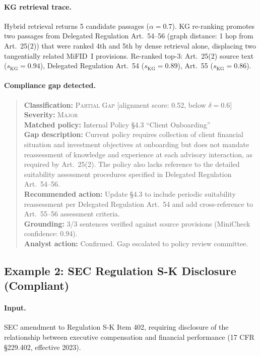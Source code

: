 \documentclass[11pt]{article}
\begin{document}
\paragraph{KG retrieval trace.}  Hybrid retrieval returns 5 candidate passages ($\alpha{=}0.7$). KG re-ranking promotes two passages from Delegated Regulation Art.~54--56 (graph distance: 1 hop from Art.~25(2)) that were ranked 4th and 5th by dense retrieval alone, displacing two tangentially related MiFID~I provisions. Re-ranked top-3: Art.~25(2) source text ($s_{\text{KG}}{=}0.94$), Delegated Regulation Art.~54 ($s_{\text{KG}}{=}0.89$), Art.~55 ($s_{\text{KG}}{=}0.86$).

\paragraph{Compliance gap detected.}
\begin{quote}
	\small
	\textbf{Classification:} \textsc{Partial Gap} \hfill [alignment score: 0.52, below $\delta{=}0.6$] \\
	\textbf{Severity:} \textsc{Major} \\
	\textbf{Matched policy:} Internal Policy \S4.3 ``Client Onboarding'' \\
	\textbf{Gap description:} Current policy requires collection of client financial situation and investment objectives at onboarding but does not mandate reassessment of knowledge and experience at each advisory interaction, as required by Art.~25(2). The policy also lacks reference to the detailed suitability assessment procedures specified in Delegated Regulation Art.~54--56. \\
	\textbf{Recommended action:} Update \S4.3 to include periodic suitability reassessment per Delegated Regulation Art.~54 and add cross-reference to Art.~55--56 assessment criteria. \\
	\textbf{Grounding:} 3/3 sentences verified against source provisions (MiniCheck confidence: 0.94). \\
	\textbf{Analyst action:} Confirmed. Gap escalated to policy review committee.
\end{quote}

\subsection{Example 2: SEC Regulation S-K Disclosure (Compliant)}

\paragraph{Input.}  SEC amendment to Regulation S-K Item 402, requiring disclosure of the relationship between executive compensation and financial performance (17 CFR \S229.402, effective 2023).
\end{document}
